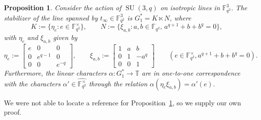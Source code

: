 \documentclass[11pt]{article}
\newtheorem{proposition}[theo]{Proposition}
\theoremstyle{definition}
\numberwithin{equation}{section}
\begin{document}
\begin{proposition}
\label{prop:PSU stabilizer}
Consider the action of $\operatorname{SU}(3,q)$ on isotropic lines in $\mathbb{F}_{q^2}^3$.
The stabilizer of the line spanned by $t_\infty \in\mathbb{F}_{q^2}^3$ is $G_1^* = K \ltimes N$, where
\[ 
K := \{ \eta_e : e \in \mathbb{F}_{q^2}^\times \},
\qquad
N := \{ \xi_{a,b} : a,b \in \mathbb{F}_{q^2},\, a^{q+1} + b + b^q = 0\},
\]
with $\eta_{e}$ and $\xi_{a,b}$ given by
\[
\eta_e:=\begin{bmatrix}e & 0 & 0 \\ 0 & e^{q-1} & 0 \\ 0 & 0 & e^{-q} \end{bmatrix},
\qquad
\xi_{a,b}:=\begin{bmatrix}1 & a & b \\ 0 & 1 & -a^q \\ 0 & 0 & 1 \end{bmatrix}
\qquad
(e \in \mathbb{F}_{q^2}^\times, a^{q+1}+b+b^q = 0).
\]
Furthermore, the linear characters $\alpha\colon G_1^* \to \mathbb{T}$ are in one-to-one correspondence with the characters $\alpha'\in\widehat{\mathbb{F}_{q^2}^\times}$ through the relation $\alpha(\eta_e \xi_{a,b})=\alpha'(e)$.
\end{proposition}

We were not able to locate a reference for Proposition~\ref{prop:PSU stabilizer}, so we supply our own proof.
\end{document}
